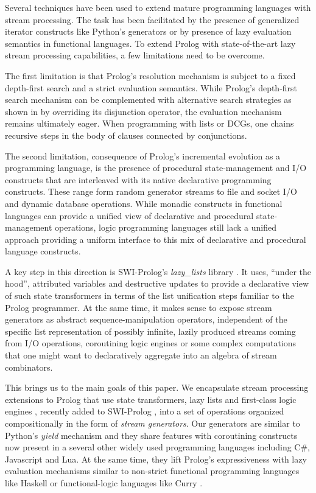 \documentclass{new_tlp}
\begin{document}
Several techniques have been used to extend mature programming languages with stream processing. The task has been facilitated by the presence of generalized iterator constructs like Python's generators or by presence of lazy evaluation semantics in functional languages. To extend Prolog with state-of-the-art lazy stream processing capabilities, a few limitations need to be overcome.

The first limitation is that Prolog's resolution mechanism is subject to a fixed depth-first search and a strict evaluation semantics.
While Prolog's depth-first  search mechanism can be complemented with alternative search strategies as shown in \cite{tor} by overriding its disjunction operator, the evaluation mechanism remains ultimately eager. When programming with lists or DCGs, one chains recursive steps
in the body of clauses connected by conjunctions. 

The second limitation, consequence of Prolog's incremental evolution as a programming language, is the presence of procedural state-management and I/O constructs that are
interleaved with its native declarative programming constructs. These range form 
random generator streams to file and socket I/O and dynamic database operations.
While monadic constructs in functional languages \cite{moggi:monads,wadler93:cont}  can provide  a unified view of declarative and procedural state-management operations, logic programming languages still lack a unified approach providing a uniform interface to 
this mix of declarative and procedural language constructs.

A key step in this direction is SWI-Prolog's \cite{swi} {\em lazy\_lists} library \cite{lazy_lists}.
 It uses, ``under the hood'', attributed variables and destructive updates  to provide a declarative view of such state transformers in terms of the list unification steps familiar to the Prolog programmer. 
At the same time, it makes sense to expose stream generators as abstract sequence-manipulation operators, independent of the specific list representation of
possibly infinite, lazily produced streams coming from I/O operations, coroutining logic engines or some complex computations that one might want to declaratively aggregate into an algebra of stream combinators.


This brings us to the main goals of this paper. 
We encapsulate stream processing extensions to Prolog that use
state transformers, lazy lists and first-class logic engines 
\cite{tarau:cl2000,bp2011}, recently added to SWI-Prolog \cite{swi_engines},
into a set of operations organized compositionally in the form of {\em 
stream generators}.
Our generators are similar to Python's {\em yield} mechanism \cite{beazley09} and 
they share features with coroutining constructs now present in a several other widely used programming languages including C\#, Javascript and Lua. At the same time, 
they lift Prolog's expressiveness with lazy evaluation mechanisms similar to non-strict
functional programming languages like Haskell \cite{hudak07} or functional-logic languages like Curry \cite{antoy05}.
\end{document}

